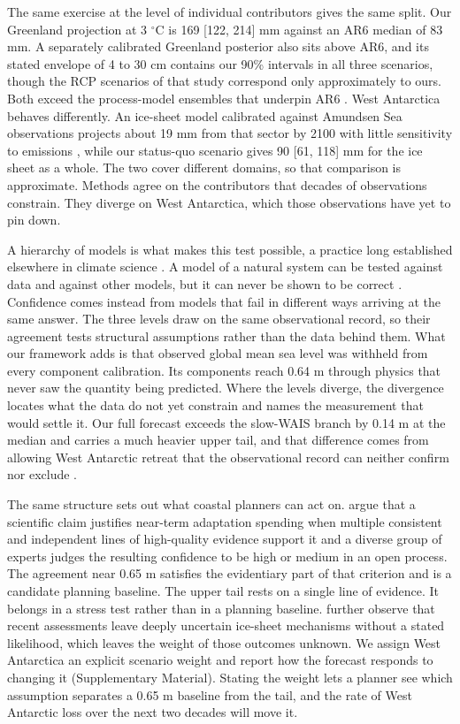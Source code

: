 \documentclass[12pt]{article}
\begin{document}
The same exercise at the level of individual contributors gives the same split. Our Greenland projection at 3 $^\circ$C is 169 [122, 214] mm against an AR6 median of 83 mm. A separately calibrated Greenland posterior \citep{Aschwanden2022} also sits above AR6, and its stated envelope of 4 to 30 cm contains our 90\% intervals in all three scenarios, though the RCP scenarios of that study correspond only approximately to ours. Both exceed the process-model ensembles that underpin AR6 \citep{Seroussi2020, Edwards2021}. West Antarctica behaves differently. An ice-sheet model calibrated against Amundsen Sea observations projects about 19 mm from that sector by 2100 with little sensitivity to emissions \citep{Rosier2025}, while our status-quo scenario gives 90 [61, 118] mm for the ice sheet as a whole. The two cover different domains, so that comparison is approximate. Methods agree on the contributors that decades of observations constrain. They diverge on West Antarctica, which those observations have yet to pin down.

A hierarchy of models is what makes this test possible, a practice long established elsewhere in climate science \citep{Held2005, Jeevanjee2017, Maher2019}. A model of a natural system can be tested against data and against other models, but it can never be shown to be correct \citep{Oreskes1994}. Confidence comes instead from models that fail in different ways arriving at the same answer. The three levels draw on the same observational record, so their agreement tests structural assumptions rather than the data behind them. What our framework adds is that observed global mean sea level was withheld from every component calibration. Its components reach 0.64 m through physics that never saw the quantity being predicted. Where the levels diverge, the divergence locates what the data do not yet constrain and names the measurement that would settle it. Our full forecast exceeds the slow-WAIS branch by 0.14 m at the median and carries a much heavier upper tail, and that difference comes from allowing West Antarctic retreat that the observational record can neither confirm nor exclude \citep{Aschwanden2021, Felikson2025}.

The same structure sets out what coastal planners can act on. \citet{Lipscomb2025} argue that a scientific claim justifies near-term adaptation spending when multiple consistent and independent lines of high-quality evidence support it and a diverse group of experts judges the resulting confidence to be high or medium in an open process. The agreement near 0.65 m satisfies the evidentiary part of that criterion and is a candidate planning baseline. The upper tail rests on a single line of evidence. It belongs in a stress test rather than in a planning baseline. \citet{Lipscomb2025} further observe that recent assessments leave deeply uncertain ice-sheet mechanisms without a stated likelihood, which leaves the weight of those outcomes unknown. We assign West Antarctica an explicit scenario weight and report how the forecast responds to changing it (Supplementary Material). Stating the weight lets a planner see which assumption separates a 0.65 m baseline from the tail, and the rate of West Antarctic loss over the next two decades will move it.



\end{document}
